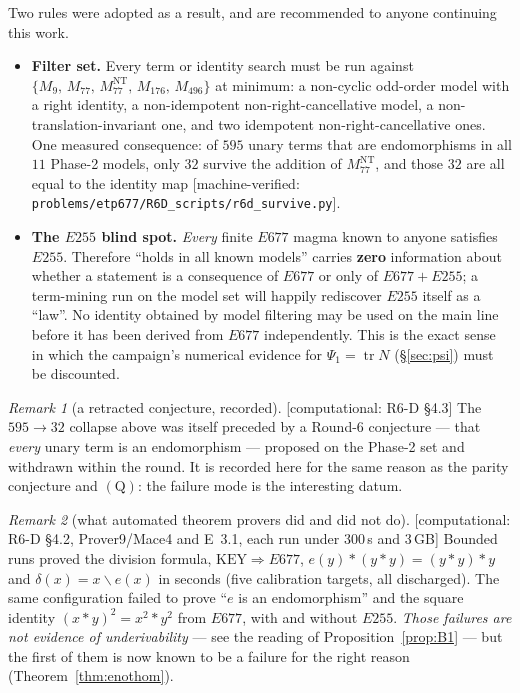 \documentclass[11pt]{article}
\theoremstyle{plain}
\theoremstyle{definition}
\theoremstyle{remark}
\newtheorem*{remark*}{Remark}
\numberwithin{equation}{section}
\newcommand{\op}{\mathbin{*}}
\newcommand{\tr}{\operatorname{tr}}
\newcommand{\statusbox}[1]{{\small\sloppy\textsf{[#1]}}}
\newcommand{\MV}[1]{\statusbox{machine-verified: \texttt{#1}}}
\newcommand{\COMP}[1]{\statusbox{computational: #1}}
\begin{document}
Two rules were adopted as a result, and are recommended to anyone continuing this
work.

\begin{itemize}
\item \textbf{Filter set.} Every term or identity search must be run against
$\{M_9,\,M_{77},\,M_{77}^{\mathrm{NT}},\,M_{176},\,M_{496}\}$ at minimum: a
non-cyclic odd-order model with a right identity, a non-idempotent
non-right-cancellative model, a non-translation-invariant one, and two
idempotent non-right-cancellative ones. One measured consequence: of $595$
unary terms that are endomorphisms in all $11$ Phase-2 models, only $32$ survive
the addition of $M_{77}^{\mathrm{NT}}$, and those $32$ are all equal to the
identity map \MV{problems\slash etp677\slash R6D\_scripts\slash r6d\_survive.py}.
\item \textbf{The $E255$ blind spot.} \emph{Every} finite $E677$ magma known to
anyone satisfies $E255$. Therefore ``holds in all known models'' carries
\textbf{zero} information about whether a statement is a consequence of $E677$ or
only of $E677+E255$; a term-mining run on the model set will happily rediscover
$E255$ itself as a ``law''. No identity obtained by model filtering may be used on
the main line before it has been derived from $E677$ independently. This is the
exact sense in which the campaign's numerical evidence for $\Psi_1 = \tr N$
(\S\ref{sec:psi}) must be discounted.
\end{itemize}

\begin{remark*}[a retracted conjecture, recorded]
\COMP{R6-D \S4.3}
The $595\to32$ collapse above was itself preceded by a Round-6 conjecture --- that
\emph{every} unary term is an endomorphism --- proposed on the Phase-2 set and
withdrawn within the round. It is recorded here for the same reason as the parity
conjecture and $(\mathrm{Q})$: the failure mode is the interesting datum.
\end{remark*}

\begin{remark*}[what automated theorem provers did and did not do]
\COMP{R6-D \S4.2, Prover9/Mace4 and E~3.1, each run under $300$\,s and $3$\,GB}
Bounded runs proved the division formula, $\mathrm{KEY}\Rightarrow E677$,
$e(y)\op(y\op y) = (y\op y)\op y$ and $\delta(x) = x\backslash e(x)$ in seconds
(five calibration targets, all discharged). The same configuration failed to prove
``$e$ is an endomorphism'' and the square identity $(x\op y)^2 = x^2\op y^2$ from
$E677$, with and without $E255$. \emph{Those failures are not evidence of
underivability} --- see the reading of Proposition~\ref{prop:B1} --- but the first
of them is now known to be a failure for the right reason
(Theorem~\ref{thm:enothom}).
\end{remark*}
\end{document}
